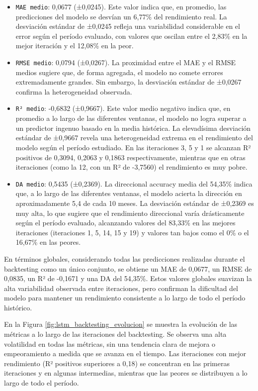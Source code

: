 \begin{enumerate}
    \begin{itemize}
        \item \texttt{MAE medio}: 0,0677 (±0,0245). Este valor indica que, en promedio, las predicciones del modelo se desvían un 6,77\% del rendimiento real. La desviación estándar de ±0,0245 refleja una variabilidad considerable en el error según el período evaluado, con valores que oscilan entre el 2,83\% en la mejor iteración y el 12,08\% en la peor.
        \item \texttt{RMSE medio}: 0,0794 (±0,0267). La proximidad entre el MAE y el RMSE medios sugiere que, de forma agregada, el modelo no comete errores extremadamente grandes. Sin embargo, la desviación estándar de ±0,0267 confirma la heterogeneidad observada.
        \item \texttt{R² medio}: -0,6832 (±0,9667). Este valor medio negativo indica que, en promedio a lo largo de las diferentes ventanas, el modelo no logra superar a un predictor ingenuo basado en la media histórica. La elevadísima desviación estándar de ±0,9667 revela una heterogeneidad extrema en el rendimiento del modelo según el período estudiado. En las iteraciones 3, 5 y 1 se alcanzan R² positivos de 0,3094, 0,2063 y 0,1863 respectivamente, mientras que en otras iteraciones (como la 12, con un R² de -3,7560) el rendimiento es muy pobre.
        \item \texttt{DA medio}: 0,5435 (±0,2369). La direccional accuracy media del 54,35\% indica que, a lo largo de las diferentes ventanas, el modelo acierta la dirección en aproximadamente 5,4 de cada 10 meses. La desviación estándar de ±0,2369 es muy alta, lo que sugiere que el rendimiento direccional varía drásticamente según el período evaluado, alcanzando valores del 83,33\% en las mejores iteraciones (iteraciones 1, 5, 14, 15 y 19) y valores tan bajos como el 0\% o el 16,67\% en las peores.
    \end{itemize}

    En términos globales, considerando todas las predicciones realizadas durante el backtesting como un único conjunto, se obtiene un MAE de 0,0677, un RMSE de 0,0835, un R² de -0,1671 y una DA del 54,35\%. Estos valores globales suavizan la alta variabilidad observada entre iteraciones, pero confirman la dificultad del modelo para mantener un rendimiento consistente a lo largo de todo el período histórico.

    En la Figura \ref{fig:lstm_backtesting_evolucion} se muestra la evolución de las métricas a lo largo de las iteraciones del backtesting. Se observa una alta volatilidad en todas las métricas, sin una tendencia clara de mejora o empeoramiento a medida que se avanza en el tiempo. Las iteraciones con mejor rendimiento (R² positivos superiores a 0,18) se concentran en las primeras iteraciones y en algunas intermedias, mientras que las peores se distribuyen a lo largo de todo el período.


\end{enumerate}
